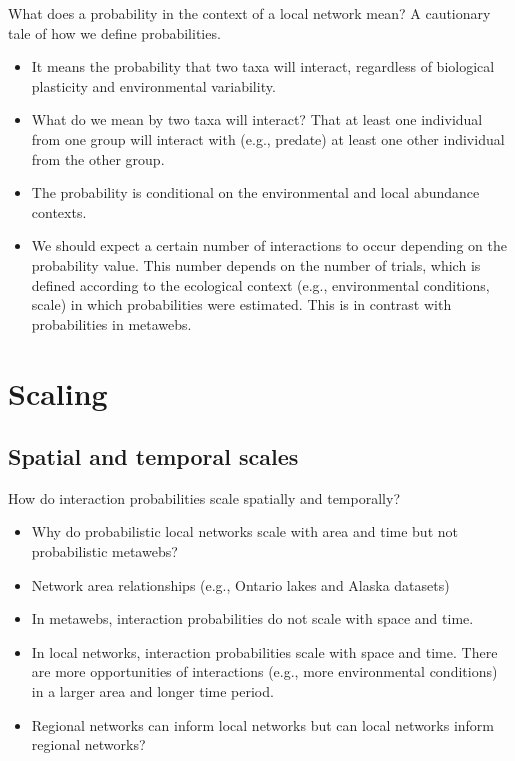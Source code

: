 \documentclass[10pt,oneside]{article}
\begin{document}
What does a probability in the context of a local network mean? A
cautionary tale of how we define probabilities.

\begin{itemize}
\tightlist
\item
  It means the probability that two taxa will interact, regardless of
  biological plasticity and environmental variability.
\item
  What do we mean by two taxa will interact? That at least one
  individual from one group will interact with (e.g., predate) at least
  one other individual from the other group.
\item
  The probability is conditional on the environmental and local
  abundance contexts.
\item
  We should expect a certain number of interactions to occur depending
  on the probability value. This number depends on the number of trials,
  which is defined according to the ecological context (e.g.,
  environmental conditions, scale) in which probabilities were
  estimated. This is in contrast with probabilities in metawebs.
\end{itemize}

\hypertarget{scaling}{%
\section{Scaling}\label{scaling}}

\hypertarget{spatial-and-temporal-scales}{%
\subsection{Spatial and temporal
scales}\label{spatial-and-temporal-scales}}

How do interaction probabilities scale spatially and temporally?

\begin{itemize}
\tightlist
\item
  Why do probabilistic local networks scale with area and time but not
  probabilistic metawebs?
\item
  Network area relationships (e.g., Ontario lakes and Alaska datasets)
\item
  In metawebs, interaction probabilities do not scale with space and
  time.
\item
  In local networks, interaction probabilities scale with space and
  time. There are more opportunities of interactions (e.g., more
  environmental conditions) in a larger area and longer time period.
\item
  Regional networks can inform local networks but can local networks
  inform regional networks?
\end{itemize}
\end{document}
